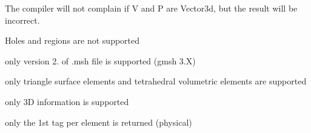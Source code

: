 \begin{DoxyRefList}
\item[Member \doxylink{namespaceigl_af7eb3109db11f7024416cd77670e4bb6}{igl\+::project} (const Eigen\+::\+Matrix\+Base$<$ Derived\+V $>$ \&V, const Eigen\+::\+Matrix\+Base$<$ Derived\+M $>$ \&model, const Eigen\+::\+Matrix\+Base$<$ Derived\+N $>$ \&proj, const Eigen\+::\+Matrix\+Base$<$ Derived\+O $>$ \&viewport, Eigen\+::\+Plain\+Object\+Base$<$ Derived\+P $>$ \&P)]\label{bug__bug000012}%
%
The compiler will not complain if V and P are Vector3d, but the result will be incorrect. 
\item[Member \doxylink{namespaceigl_aa40ef4e0517c71c597272824497377b2}{igl\+::read\+MESH} (const std\+::string mesh\+\_\+file\+\_\+name, Eigen\+::\+Plain\+Object\+Base$<$ Derived\+V $>$ \&V, Eigen\+::\+Plain\+Object\+Base$<$ Derived\+T $>$ \&T, Eigen\+::\+Plain\+Object\+Base$<$ Derived\+F $>$ \&F)]\label{bug__bug000013}%
%
Holes and regions are not supported  
\item[Member \doxylink{namespaceigl_a71568db686b70c51b2b3ea414c348a86}{igl\+::read\+MSH} (const std\+::string \&msh, Eigen\+::\+Matrix\+Xd \&X, Eigen\+::\+Matrix\+Xi \&Tri, Eigen\+::\+Matrix\+Xi \&Tet, Eigen\+::\+Vector\+Xi \&Tri\+Tag, Eigen\+::\+Vector\+Xi \&Tet\+Tag, std\+::vector$<$ std\+::string $>$ \&XFields, std\+::vector$<$ Eigen\+::\+Matrix\+Xd $>$ \&XF, std\+::vector$<$ std\+::string $>$ \&EFields, std\+::vector$<$ Eigen\+::\+Matrix\+Xd $>$ \&TriF, std\+::vector$<$ Eigen\+::\+Matrix\+Xd $>$ \&TetF)]\label{bug__bug000014}%
%
only version 2. of .msh file is supported (gmsh 3.\+X) 



only triangle surface elements and tetrahedral volumetric elements are supported 



only 3D information is supported 



only the 1st tag per element is returned (physical) 




\end{DoxyRefList}
